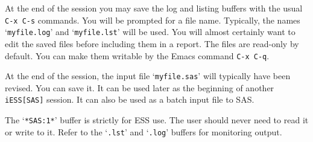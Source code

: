 \documentclass{article}
\newcommand{\stexttt}[1]{{\small\texttt{#1}}}
\newenvironment{Salltt}{\small\begin{alltt}}{\end{alltt}}
\newcommand{\file}[1]{`\stexttt{#1}'}
\begin{document}
At the end of the session you may save the log and listing buffers
with the usual \stexttt{C-x C-s} commands.  You will be prompted for a
file name.  Typically, the names \file{myfile.log} and
\file{myfile.lst} will be used.  You will almost certainly want to
edit the saved files before including them in a report.  The files are
read-only by default.  You can make them writable by the Emacs command
\stexttt{C-x C-q}.
 
At the end of the session, the input file \file{myfile.sas} will
typically have been revised.  You can save it.  It can be used later
as the beginning of another \stexttt{iESS[SAS]} session.  It can also
be used as a batch input file to SAS.
 
The \file{*SAS:1*} buffer is strictly for ESS use.  The user should
never need to read it or write to it.  Refer to the \file{.lst} and
\file{.log} buffers for monitoring output.



\end{document}
